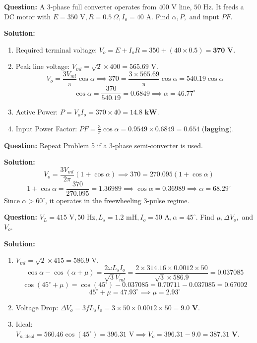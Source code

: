 \documentclass[11pt,a4paper]{article}
\begin{document}
\begin{examplebox}
\textbf{Question:} A 3-phase full converter operates from $400\text{ V}$ line, $50\text{ Hz}$. It feeds a DC motor with $E = 350\text{ V}, R = 0.5\ \Omega, I_o = 40\text{ A}$. Find $\alpha, P,$ and input $PF$.

\tcbline
\textbf{Solution:}
\begin{enumerate}[leftmargin=*]
  \item Required terminal voltage: $V_o = E + I_o R = 350 + (40 \times 0.5) = \mathbf{370\text{ V}}$.
  \item Peak line voltage: $V_{ml} = \sqrt{2} \times 400 = 565.69\text{ V}$.
  \[
  V_o = \frac{3 V_{ml}}{\pi} \cos\alpha \implies 370 = \frac{3 \times 565.69}{\pi} \cos\alpha = 540.19 \cos\alpha
  \]
  \[
  \cos\alpha = \frac{370}{540.19} = 0.6849 \implies \alpha = \mathbf{46.77^\circ}
  \]
  \item Active Power: $P = V_o I_o = 370 \times 40 = \mathbf{14.8\text{ kW}}$.
  \item Input Power Factor: $PF = \frac{3}{\pi} \cos\alpha = 0.9549 \times 0.6849 = \mathbf{0.654\text{ (lagging)}}$.
\end{enumerate}
\end{examplebox}

\begin{examplebox}
\textbf{Question:} Repeat Problem 5 if a 3-phase semi-converter is used.

\tcbline
\textbf{Solution:}
\[
V_o = \frac{3 V_{ml}}{2\pi} (1 + \cos\alpha) \implies 370 = 270.095 (1 + \cos\alpha)
\]
\[
1 + \cos\alpha = \frac{370}{270.095} = 1.36989 \implies \cos\alpha = 0.36989 \implies \alpha = \mathbf{68.29^\circ}
\]
Since $\alpha > 60^\circ$, it operates in the freewheeling 3-pulse regime.
\end{examplebox}

\begin{examplebox}
\textbf{Question:} $V_L = 415\text{ V}, 50\text{ Hz}, L_s = 1.2\text{ mH}, I_o = 50\text{ A}, \alpha = 45^\circ$. Find $\mu, \Delta V_o,$ and $V_o$.

\tcbline
\textbf{Solution:}
\begin{enumerate}[leftmargin=*]
  \item $V_{ml} = \sqrt{2} \times 415 = 586.9\text{ V}$.
  \[
  \cos\alpha - \cos(\alpha+\mu) = \frac{2\omega L_s I_o}{\sqrt{3} V_{ml}} = \frac{2 \times 314.16 \times 0.0012 \times 50}{\sqrt{3} \times 586.9} = 0.037085
  \]
  \[
  \cos(45^\circ + \mu) = \cos(45^\circ) - 0.037085 = 0.70711 - 0.037085 = 0.67002
  \]
  \[
  45^\circ + \mu = 47.93^\circ \implies \mu = \mathbf{2.93^\circ}
  \]
  \item Voltage Drop: $\Delta V_o = 3 f L_s I_o = 3 \times 50 \times 0.0012 \times 50 = \mathbf{9.0\text{ V}}$.
  \item Ideal: $V_{o,\text{ideal}} = 560.46 \cos(45^\circ) = 396.31\text{ V} \implies V_o = 396.31 - 9.0 = \mathbf{387.31\text{ V}}$.
\end{enumerate}
\end{examplebox}
\end{document}

